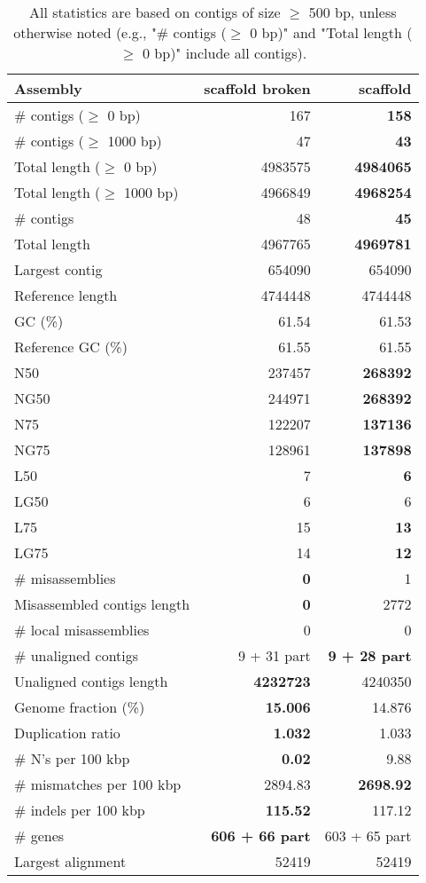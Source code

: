 \documentclass[12pt,a4paper]{article}
\begin{document}
\begin{table}[ht]
\begin{center}
\caption{All statistics are based on contigs of size $\geq$ 500 bp, unless otherwise noted (e.g., "\# contigs ($\geq$ 0 bp)" and "Total length ($\geq$ 0 bp)" include all contigs).}
\begin{tabular}{|l*{2}{|r}|}
\hline
Assembly & scaffold broken & scaffold \\ \hline
\# contigs ($\geq$ 0 bp) & 167 & {\bf 158} \\ \hline
\# contigs ($\geq$ 1000 bp) & 47 & {\bf 43} \\ \hline
Total length ($\geq$ 0 bp) & 4983575 & {\bf 4984065} \\ \hline
Total length ($\geq$ 1000 bp) & 4966849 & {\bf 4968254} \\ \hline
\# contigs & 48 & {\bf 45} \\ \hline
Total length & 4967765 & {\bf 4969781} \\ \hline
Largest contig & 654090 & 654090 \\ \hline
Reference length & 4744448 & 4744448 \\ \hline
GC (\%) & 61.54 & 61.53 \\ \hline
Reference GC (\%) & 61.55 & 61.55 \\ \hline
N50 & 237457 & {\bf 268392} \\ \hline
NG50 & 244971 & {\bf 268392} \\ \hline
N75 & 122207 & {\bf 137136} \\ \hline
NG75 & 128961 & {\bf 137898} \\ \hline
L50 & 7 & {\bf 6} \\ \hline
LG50 & 6 & 6 \\ \hline
L75 & 15 & {\bf 13} \\ \hline
LG75 & 14 & {\bf 12} \\ \hline
\# misassemblies & {\bf 0} & 1 \\ \hline
Misassembled contigs length & {\bf 0} & 2772 \\ \hline
\# local misassemblies & 0 & 0 \\ \hline
\# unaligned contigs & 9 + 31 part & {\bf 9 + 28 part} \\ \hline
Unaligned contigs length & {\bf 4232723} & 4240350 \\ \hline
Genome fraction (\%) & {\bf 15.006} & 14.876 \\ \hline
Duplication ratio & {\bf 1.032} & 1.033 \\ \hline
\# N's per 100 kbp & {\bf 0.02} & 9.88 \\ \hline
\# mismatches per 100 kbp & 2894.83 & {\bf 2698.92} \\ \hline
\# indels per 100 kbp & {\bf 115.52} & 117.12 \\ \hline
\# genes & {\bf 606 + 66 part} & 603 + 65 part \\ \hline
Largest alignment & 52419 & 52419 \\ \hline
\end{tabular}
\end{center}
\end{table}
\end{document}
